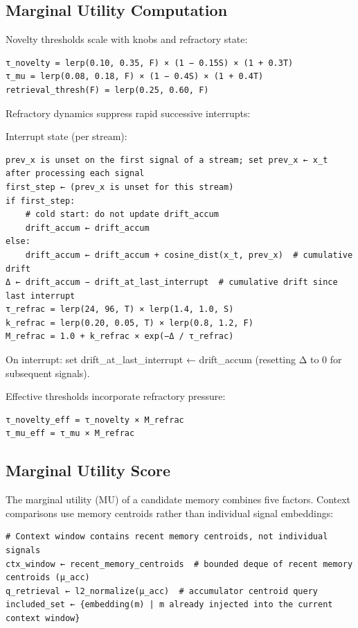 \documentclass[
  letterpaper,
  DIV=11,
  numbers=noendperiod]{scrartcl}
\begin{document}
\subsection{Marginal Utility
Computation}\label{marginal-utility-computation}

Novelty thresholds scale with knobs and refractory state:

\begin{verbatim}
τ_novelty = lerp(0.10, 0.35, F) × (1 − 0.15S) × (1 + 0.3T)
τ_mu = lerp(0.08, 0.18, F) × (1 − 0.4S) × (1 + 0.4T)
retrieval_thresh(F) = lerp(0.25, 0.60, F)
\end{verbatim}

Refractory dynamics suppress rapid successive interrupts:

Interrupt state (per stream):

\begin{verbatim}
prev_x is unset on the first signal of a stream; set prev_x ← x_t after processing each signal
first_step ← (prev_x is unset for this stream)
if first_step:
    # cold start: do not update drift_accum
    drift_accum ← drift_accum
else:
    drift_accum ← drift_accum + cosine_dist(x_t, prev_x)  # cumulative drift
Δ ← drift_accum − drift_at_last_interrupt  # cumulative drift since last interrupt
τ_refrac = lerp(24, 96, T) × lerp(1.4, 1.0, S)
k_refrac = lerp(0.20, 0.05, T) × lerp(0.8, 1.2, F)
M_refrac = 1.0 + k_refrac × exp(−Δ / τ_refrac)
\end{verbatim}

On interrupt: set drift\_at\_last\_interrupt ← drift\_accum (resetting Δ
to 0 for subsequent signals).

Effective thresholds incorporate refractory pressure:

\begin{verbatim}
τ_novelty_eff = τ_novelty × M_refrac
τ_mu_eff = τ_mu × M_refrac
\end{verbatim}

\subsection{Marginal Utility Score}\label{marginal-utility-score}

The marginal utility (MU) of a candidate memory combines five factors.
Context comparisons use memory centroids rather than individual signal
embeddings:

\begin{verbatim}
# Context window contains recent memory centroids, not individual signals
ctx_window ← recent_memory_centroids  # bounded deque of recent memory centroids (μ_acc)
q_retrieval ← l2_normalize(μ_acc)  # accumulator centroid query
included_set ← {embedding(m) | m already injected into the current context window}
\end{verbatim}
\end{document}
